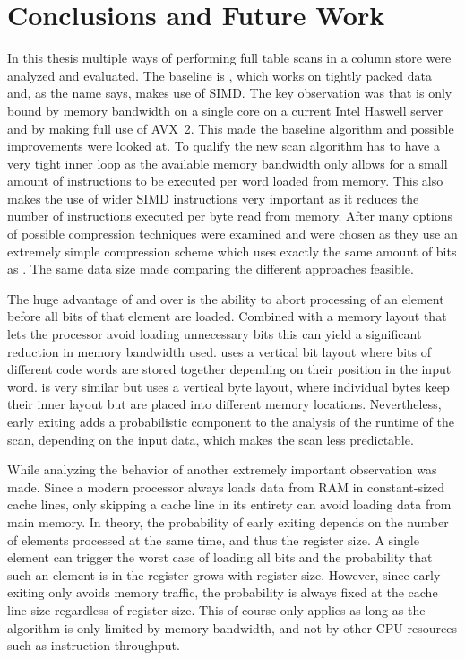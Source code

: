 \chapter{Conclusions and Future Work}
\label{chapter:conclusions}

In this thesis multiple ways of performing full table scans in a column
store were analyzed and evaluated. The baseline is \simdscan{}, which works on
tightly packed data and, as the name says, makes use of SIMD. The key
observation was that \simdscan{} is only bound by memory bandwidth on a single
core on a current Intel Haswell server and by making full use of AVX~2. This
made \simdscan{} the baseline algorithm and possible improvements were looked
at. To qualify the new scan algorithm has to have a very tight inner loop as
the available memory bandwidth only allows for a small amount of instructions
to be executed per word loaded from memory. This also makes the use of wider
SIMD instructions very important as it reduces the number of instructions
executed per byte read from memory. After many options of possible compression
techniques were examined \bwv{} and \bs{} were chosen as they use an extremely
simple compression scheme which uses exactly the same amount of bits as
\simdscan{}. The same data size made comparing the different approaches
feasible.

The huge advantage of \bwv{} and \bs{} over \simdscan{} is the ability to abort
processing of an element before all bits of that element are loaded. Combined
with a memory layout that lets the processor avoid loading unnecessary bits
this can yield a significant reduction in memory bandwidth used. \bwv{} uses a
vertical bit layout where bits of different code words are stored together
depending on their position in the input word. \bs{} is very similar but uses a
vertical byte layout, where individual bytes keep their inner layout but are
placed into different memory locations. Nevertheless, early exiting adds a
probabilistic component to the analysis of the runtime of the scan, depending on
the input data, which makes the scan less predictable.

While analyzing the behavior of \bwv{} another extremely important observation
was made. Since a modern processor always loads data from RAM in constant-sized
cache lines, only skipping a cache line in its entirety can avoid loading data
from main memory. In theory, the probability of early exiting depends on the
number of elements processed at the same time, and thus the register size. A
single element can trigger the worst case of loading all bits and the
probability that such an element is in the register grows with register size.
However, since early exiting only avoids memory traffic, the probability is
always fixed at the cache line size regardless of register size. This of course
only applies as long as the algorithm is only limited by memory bandwidth, and
not by other CPU resources such as instruction throughput.

